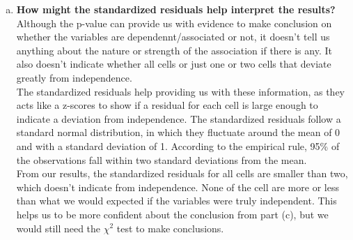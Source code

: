 \documentclass[12pt,letterpaper]{article}
\begin{document}
\begin{enumerate} [(a)]
	\item \textbf{How might the standardized residuals help interpret the results?} \\
	Although the p-value can provide us with evidence to make conclusion on whether the variables are dependennt/associated or not, it doesn't tell us anything about the nature or strength of the association if there is any. It also doesn't indicate whether all cells or just one or two cells that deviate greatly from independence. \\
	The standardized residuals help providing us with these information, as they acts like a z-scores to show if a residual for each cell is large enough to indicate a deviation from independence. The standardized residuals follow a standard normal distribution, in which they fluctuate around the mean of 0 and with a standard deviation of 1. According to the empirical rule, 95\% of the observations fall within two standard deviations from the mean. \\
	From our results, the standardized residuals for all cells are smaller than two, which doesn't indicate from independence. None of the cell are more or less than what we would expected if the variables were truly independent. This helps us to be more confident about the conclusion from part (c), but we would still need the $\chi^2$ test to make conclusions.
\end{enumerate}
\end{document}
